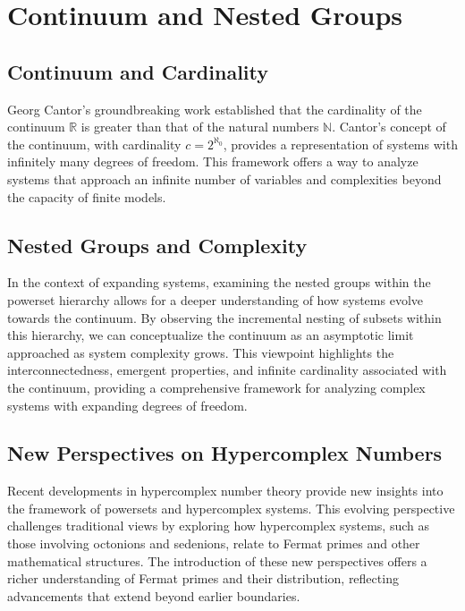 \documentclass[12pt]{article}
\begin{document}
\section{Continuum and Nested Groups}

\subsection{Continuum and Cardinality}

Georg Cantor’s groundbreaking work established that the cardinality of the continuum \( \mathbb{R} \) is greater than that of the natural numbers \( \mathbb{N} \). Cantor’s concept of the continuum, with cardinality \( c = 2^{\aleph_0} \), provides a representation of systems with infinitely many degrees of freedom. This framework offers a way to analyze systems that approach an infinite number of variables and complexities beyond the capacity of finite models.

\subsection{Nested Groups and Complexity}

In the context of expanding systems, examining the nested groups within the powerset hierarchy allows for a deeper understanding of how systems evolve towards the continuum. By observing the incremental nesting of subsets within this hierarchy, we can conceptualize the continuum as an asymptotic limit approached as system complexity grows. This viewpoint highlights the interconnectedness, emergent properties, and infinite cardinality associated with the continuum, providing a comprehensive framework for analyzing complex systems with expanding degrees of freedom.

\subsection{New Perspectives on Hypercomplex Numbers}

Recent developments in hypercomplex number theory provide new insights into the framework of powersets and hypercomplex systems. This evolving perspective challenges traditional views by exploring how hypercomplex systems, such as those involving octonions and sedenions, relate to Fermat primes and other mathematical structures. The introduction of these new perspectives offers a richer understanding of Fermat primes and their distribution, reflecting advancements that extend beyond earlier boundaries.
\end{document}

